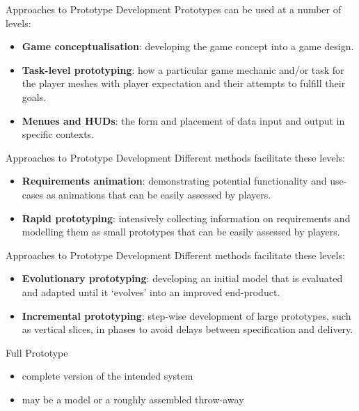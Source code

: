 \begin{frame}{Approaches to Prototype Development}
	Prototypes can be used at a number of levels:

	\begin{itemize}
		\item \textbf{Game conceptualisation}: developing the game concept into a game design.
		\item \textbf{Task-level prototyping}: how a particular game mechanic and/or task for the player meshes with player expectation and their attempts to
		fulfill their goals.
		\item \textbf{Menues and HUDs}: the form and placement of data input and output in specific contexts.
	\end{itemize}
\end{frame}

\begin{frame}{Approaches to Prototype Development}
	Different methods facilitate these levels:

	\begin{itemize}
		\item \textbf{Requirements animation}: demonstrating potential functionality and use-cases as animations that can be easily assessed by players. \pause
		\item \textbf{Rapid prototyping}: intensively collecting information on requirements and modelling them as small prototypes that can be easily assessed by players.
	\end{itemize}
\end{frame}

\begin{frame}{Approaches to Prototype Development}
	Different methods facilitate these levels:

	\begin{itemize}
		\item \textbf{Evolutionary prototyping}: developing an initial model that is evaluated and adapted until it `evolves' into an improved end-product.\pause
		\item \textbf{Incremental prototyping}: step-wise development of large prototypes, such as vertical slices, in phases to avoid delays between specification and delivery.
	\end{itemize}
\end{frame}

\begin{frame}{Full Prototype}
	\begin{itemize}
		\item complete version of the intended system
		\item may be a model or a roughly assembled throw-away
	\end{itemize}
\end{frame}

